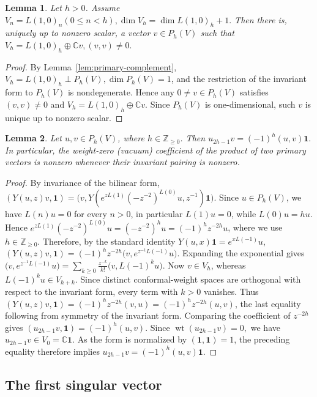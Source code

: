 \documentclass[10pt,a4paper]{amsart}
\numberwithin{equation}{section} \newtheorem{thm}{Theorem}[section] \newtheorem{lem}[thm]{Lemma} \newtheorem{ex}[thm]{Example} \newtheorem{prop}[thm]{Proposition} \newtheorem{cor}[thm]{Corollary} \newtheorem{defi}[thm]{Definition} \newtheorem{rmk}[thm]{Remark} \newtheorem{notation}[thm]{Notation}
\newcommand{\one}{\mathbf{1}}
\newcommand{\wt}{\operatorname{wt}}
\def\Z{\mathbb{Z}} \def\N{\mathbb{N}} \def\A{\mathbb{A}} \def\C{\mathbb{C}} \def\R{\mathbb{R}} \def\Q{\mathbb{Q}} \def\F{\mathbb{F}}
\begin{document}
\begin{lem}\label{lem:first-primary}
Let $h>0$. Assume \(V_n=L(1,0)_n(0\le n<h),\dim V_h=\dim L(1,0)_h+1.\) Then there is, uniquely up to nonzero scalar, a vector $v\in P_h(V)$ such that \(V_h=L(1,0)_h\oplus\C v,(v,v)\ne0.\)
\end{lem}

\begin{proof}
By Lemma~\ref{lem:primary-complement}, \(V_h=L(1,0)_h\mathbin{\perp}P_h(V),\dim P_h(V)=1\), and the restriction of the invariant form to \(P_h(V)\) is nondegenerate. Hence any \(0\ne v\in P_h(V)\) satisfies \((v,v)\ne0\) and $ V_h=L(1,0)_h\oplus\C v. $ Since \(P_h(V)\) is one-dimensional, such \(v\) is unique up to nonzero scalar.
\end{proof}

\begin{lem}\label{lem:vacuum-channel}
Let $u,v\in P_h(V)$, where $h\in\Z_{\ge0}$. Then \(u_{2h-1}v=(-1)^h(u,v)\one.\) In particular, the weight-zero (vacuum) coefficient of the product of two primary vectors is nonzero whenever their invariant pairing is nonzero.
\end{lem}

\begin{proof}
By invariance of the bilinear form, \((Y(u,z)v,\one)=\bigl(v,Y(e^{zL(1)}(-z^{-2})^{L(0)}u,z^{-1})\one\bigr)\). Since \(u\in P_h(V)\), we have \(L(n)u=0\) for every \(n>0\), in particular \(L(1)u=0\), while \(L(0)u=hu\). Hence \(e^{zL(1)}(-z^{-2})^{L(0)}u=(-z^{-2})^h u=(-1)^hz^{-2h}u\), where we use \(h\in\Z_{\ge0}\). Therefore, by the standard identity \(Y(u,x)\one=e^{xL(-1)}u\), \((Y(u,z)v,\one)=(-1)^hz^{-2h}\bigl(v,e^{z^{-1}L(-1)}u\bigr)\). Expanding the exponential gives \(\bigl(v,e^{z^{-1}L(-1)}u\bigr)=\sum_{k\ge0}\frac{z^{-k}}{k!}\bigl(v,L(-1)^ku\bigr)\). Now \(v\in V_h\), whereas \(L(-1)^ku\in V_{h+k}\). Since distinct conformal-weight spaces are orthogonal with respect to the invariant form, every term with \(k>0\) vanishes. Thus \((Y(u,z)v,\one)=(-1)^hz^{-2h}(v,u)=(-1)^hz^{-2h}(u,v)\), the last equality following from symmetry of the invariant form. Comparing the coefficient of \(z^{-2h}\) gives $ (u_{2h-1}v,\one)=(-1)^h(u,v). $ Since $ \wt(u_{2h-1}v) = 0, $ we have \(u_{2h-1}v\in V_0=\C\one\). As the form is normalized by \((\one,\one)=1\), the preceding equality therefore implies $ u_{2h-1}v=(-1)^h(u,v)\one. $
\end{proof}

\subsection{The first singular vector}
\end{document}
